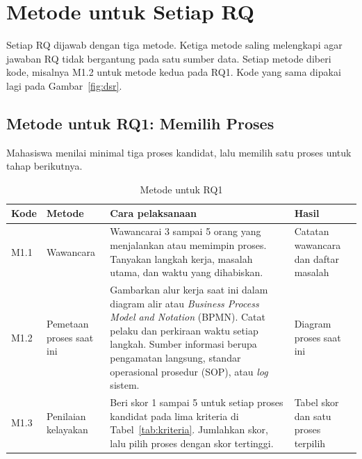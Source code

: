 \documentclass[11pt, a4paper]{article}
\newcommand{\eng}[1]{\textit{#1}}
\begin{document}
\section{Metode untuk Setiap RQ}

Setiap RQ dijawab dengan tiga metode.
Ketiga metode saling melengkapi agar jawaban RQ tidak bergantung pada satu sumber data.
Setiap metode diberi kode, misalnya M1.2 untuk metode kedua pada RQ1.
Kode yang sama dipakai lagi pada Gambar~\ref{fig:dsr}.

\subsection{Metode untuk RQ1: Memilih Proses}

Mahasiswa menilai minimal tiga proses kandidat, lalu memilih satu proses untuk tahap berikutnya.

\begin{table}[htbp]
  \centering
  \caption{Metode untuk RQ1}
  \label{tab:metode-rq1}
  \begin{tabularx}{\linewidth}{@{}L{1cm}L{2.6cm}YL{3.2cm}@{}}
    \toprule
    \textbf{Kode} & \textbf{Metode} & \textbf{Cara pelaksanaan} & \textbf{Hasil} \\
    \midrule
    M1.1 & Wawancara
         & Wawancarai 3 sampai 5 orang yang menjalankan atau memimpin proses. Tanyakan langkah kerja, masalah utama, dan waktu yang dihabiskan.
         & Catatan wawancara dan daftar masalah \\
    M1.2 & Pemetaan proses saat ini
         & Gambarkan alur kerja saat ini dalam diagram alir atau \eng{Business Process Model and Notation} (BPMN). Catat pelaku dan perkiraan waktu setiap langkah. Sumber informasi berupa pengamatan langsung, standar operasional prosedur (SOP), atau \eng{log} sistem.
         & Diagram proses saat ini \\
    M1.3 & Penilaian kelayakan
         & Beri skor 1 sampai 5 untuk setiap proses kandidat pada lima kriteria di Tabel~\ref{tab:kriteria}. Jumlahkan skor, lalu pilih proses dengan skor tertinggi.
         & Tabel skor dan satu proses terpilih \\
    \bottomrule
  \end{tabularx}
\end{table}
\end{document}
